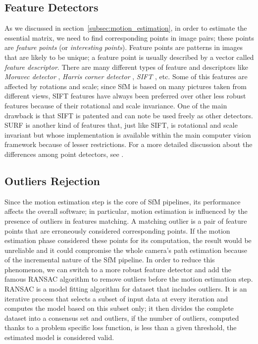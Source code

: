\subsection{Feature Detectors}
As we discussed in section~\ref{subsec:motion_estimation}, in order to estimate
the essential matrix, we need to find corresponding points in image pairs; 
these points are \textit{feature points} (or \textit{interesting points}).
Feature points are patterns in images that are likely to be unique; 
a feature point is usually described by a vector called 
\textit{feature descriptor}.
There are many different types of feature and descriptors like 
\textit{Moravec detector} \cite{moravec1980obstacle}, \textit{Harris
corner detector} \cite{harris1988combined}, 
\textit{SIFT} \cite{lowe1999object}, etc.
Some of this features are affected by rotations and scale; since SfM is based on
many pictures taken from different views, SIFT features have always been 
preferred over other less robust features because of their rotational and scale
invariance. One of the main drawback is that 
SIFT is patented and can note be used freely as other detectors.
SURF \cite{funayama2012robust} is another kind of features that, 
just like SIFT, is rotational and scale invariant but whose implementation is 
available within the main computer vision framework because of lesser 
restrictions.
For a more detailed discussion about the differences among point detectors, 
see \cite{schmidt2010evaluation,govender2009evaluation}.

\subsection{Outliers Rejection}
Since the motion estimation step is the core of SfM pipelines, its performance
affects the overall software; in particular, motion estimation is influenced 
by the presence of outliers in features matching.
A matching outlier is a pair of feature points that are erroneously considered 
corresponding points. If the motion estimation phase considered these points for
its computation, the result would be unreliable and it could compromise the 
whole camera's path estimation because of the incremental nature of the SfM 
pipeline.
In order to reduce this phenomenon, we can switch to a more robust feature 
detector and add the famous RANSAC algorithm to remove outliers before the 
motion estimation step.
RANSAC \cite{fischler1981random} is a model fitting algorithm for dataset 
that includes outliers.
It is an iterative process that selects a subset of 
input data at every iteration and computes the model based on this subset only;
it then divides the complete dataset into a consensus set and outliers, if
the number of outliers, computed thanks to a problem specific loss function, is
less than a given threshold, the estimated model is considered valid.

